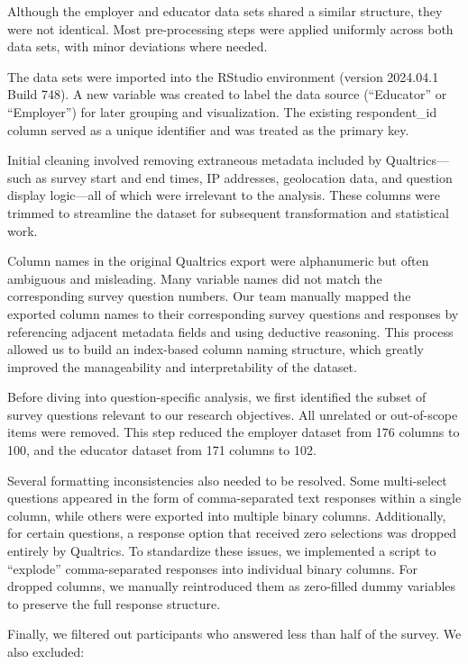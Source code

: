 \documentclass[
  12pt,
  letterpaper,
  DIV=11,
  numbers=noendperiod]{scrartcl}
\numberwithin{figure}{section}
\numberwithin{table}{section}
\begin{document}
Although the employer and educator data sets shared a similar structure,
they were not identical. Most pre-processing steps were applied
uniformly across both data sets, with minor deviations where needed.

The data sets were imported into the RStudio environment (version
2024.04.1 Build 748). A new variable was created to label the data
source (``Educator'' or ``Employer'') for later grouping and
visualization. The existing respondent\_id column served as a unique
identifier and was treated as the primary key.

Initial cleaning involved removing extraneous metadata included by
Qualtrics---such as survey start and end times, IP addresses,
geolocation data, and question display logic---all of which were
irrelevant to the analysis. These columns were trimmed to streamline the
dataset for subsequent transformation and statistical work.

Column names in the original Qualtrics export were alphanumeric but
often ambiguous and misleading. Many variable names did not match the
corresponding survey question numbers. Our team manually mapped the
exported column names to their corresponding survey questions and
responses by referencing adjacent metadata fields and using deductive
reasoning. This process allowed us to build an index-based column naming
structure, which greatly improved the manageability and interpretability
of the dataset.

Before diving into question-specific analysis, we first identified the
subset of survey questions relevant to our research objectives. All
unrelated or out-of-scope items were removed. This step reduced the
employer dataset from 176 columns to 100, and the educator dataset from
171 columns to 102.

Several formatting inconsistencies also needed to be resolved. Some
multi-select questions appeared in the form of comma-separated text
responses within a single column, while others were exported into
multiple binary columns. Additionally, for certain questions, a response
option that received zero selections was dropped entirely by Qualtrics.
To standardize these issues, we implemented a script to ``explode''
comma-separated responses into individual binary columns. For dropped
columns, we manually reintroduced them as zero-filled dummy variables to
preserve the full response structure.

Finally, we filtered out participants who answered less than half of the
survey. We also excluded:
\end{document}
